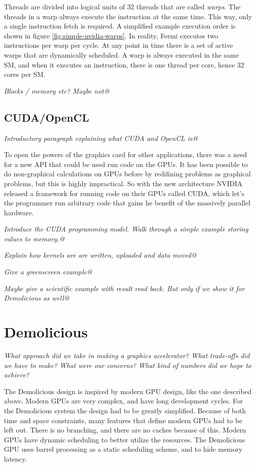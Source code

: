 \documentclass[../main/report.tex]{subfiles}
\begin{document}
Threads are divided into logical units of 32 threads that are called \emph{warps}. 
The threads in a warp always execute the instruction at the same time.
This way, only a single instruction fetch is required.
A simplified example execution order is shown in figure \ref{fig:simple-nvidia-warps}.
In reality, Fermi executes two instructions per warp per cycle. 
At any point in time there is a set of active warps that are dynamically scheduled. 
A warp is always executed in the same SM, and when it executes an instruction, there is one thread per core, hence 32 cores per SM.


\emph{Blocks / memory etc? Maybe not@}



\subsection{CUDA/OpenCL}
\emph{Introductory paragraph explaining what CUDA and OpenCL is@}

To open the powers of the graphics card for other applications, there was a need for a new API that could be
used run code on the GPUs. It has been possible to do non-graphical calculations on GPUs before by 
redifining problems as graphical problems, but this is highly impractical. 
So with the new architecture NVIDIA released a framework for running code on their GPUs called CUDA, 
which let's the programmer run arbitrary code that gains he benefit of the massively parallel hardware.

\emph{Introduce the CUDA programming model. Walk through a simple example storing values to memory.@}


\emph{Explain how kernels are are written, uploaded and data moved@}

\emph{Give a greenscreen example@}

\emph{Maybe give a scientific example with result read back. But only if we show it for Demolicious as well@}


\section{Demolicious}

\textit{What approach did we take in making a graphics accelerator?}
\textit{What trade-offs did we have to make?}
\textit{What were our concerns?}
\textit{What kind of numbers did we hope to achieve?}


The Demolicious design is inspired by modern GPU design, like the one described above.
Modern GPUs are very complex, and have long development cycles.
For the Demolicious system the design had to be greatly simplified.
Because of both time and space constraints, many features that define modern GPUs had to be left out.
There is no branching, and there are no caches because of this.
Modern GPUs have dynamic scheduling to better utilize the resources.
The Demolicious GPU uses barrel processing as a static scheduling scheme, and to hide memory latency.
\end{document}
